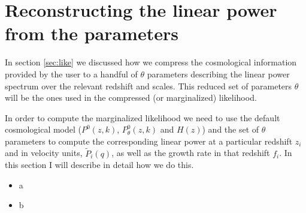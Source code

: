 \section{Reconstructing the linear power from the parameters} \label{app:P_L}

In section \ref{sec:like} we discussed how we compress the cosmological
information provided by the user to a handful of $\theta$ parameters
describing the linear power spectrum over the relevant redshift and scales.
This reduced set of parameters $\theta$ will be the ones used in the
compressed (or marginalized) likelihood.

In order to compute the marginalized likelihood we need to use the default
cosmological model ($P^0(z,k)$, $P_\theta^0(z,k)$ and $H(z)$) and the set
of $\theta$ parameters to compute the corresponding linear power at a
particular redshift $z_i$ and in velocity units, $\tilde P_i(q)$, as well
as the growth rate in that redshift $f_i$.
In this section I will describe in detail how we do this.

\begin{itemize}
 \item a
 \item b
\end{itemize}

